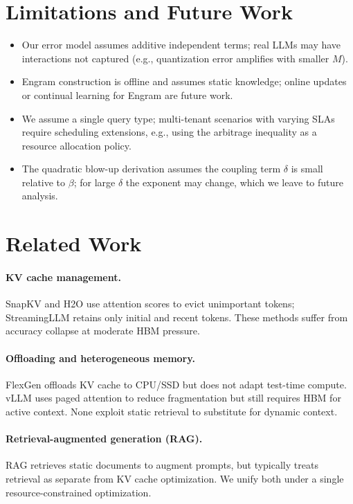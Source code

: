 \documentclass[11pt,a4paper]{article}
\theoremstyle{plain}
\theoremstyle{definition}
\begin{document}
\section{Limitations and Future Work}
\begin{itemize}
    \item Our error model assumes additive independent terms; real LLMs may have interactions not captured (e.g., quantization error amplifies with smaller $M$).
    \item Engram construction is offline and assumes static knowledge; online updates or continual learning for Engram are future work.
    \item We assume a single query type; multi-tenant scenarios with varying SLAs require scheduling extensions, e.g., using the arbitrage inequality as a resource allocation policy.
    \item The quadratic blow-up derivation assumes the coupling term $\delta$ is small relative to $\beta$; for large $\delta$ the exponent may change, which we leave to future analysis.
\end{itemize}

\section{Related Work}
\paragraph{KV cache management.} SnapKV \cite{snapkv} and H2O \cite{h2o} use attention scores to evict unimportant tokens; StreamingLLM \cite{streamingllm} retains only initial and recent tokens. These methods suffer from accuracy collapse at moderate HBM pressure.

\paragraph{Offloading and heterogeneous memory.} FlexGen \cite{flexgen} offloads KV cache to CPU/SSD but does not adapt test-time compute. vLLM \cite{vllm} uses paged attention to reduce fragmentation but still requires HBM for active context. None exploit static retrieval to substitute for dynamic context.

\paragraph{Retrieval-augmented generation (RAG).} RAG \cite{rag} retrieves static documents to augment prompts, but typically treats retrieval as separate from KV cache optimization. We unify both under a single resource-constrained optimization.
\end{document}
